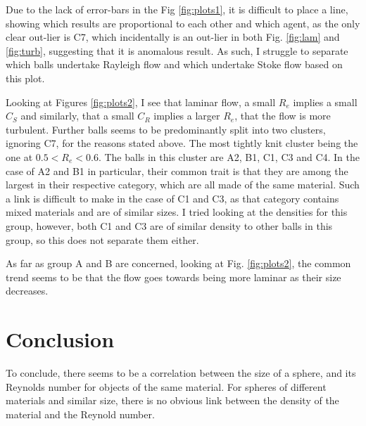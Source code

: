 \documentclass[11pt,a4paper]{article}
\begin{document}
    Due to the lack of error-bars in the Fig \ref{fig:plots1}, it is difficult to place a line, showing which results are proportional to each other and which agent, as the only clear out-lier is C7, which incidentally is an out-lier in both Fig. \ref{fig:lam} and \ref{fig:turb}, suggesting that it is anomalous result. As such, I struggle to separate which balls undertake Rayleigh flow and which undertake Stoke flow based on this plot.

    Looking at Figures \ref{fig:plots2}, I see that laminar flow, a small $R_e$ implies a small $C_S$ and similarly, that a small $C_R$ implies a larger $R_e$, that the flow is more turbulent.
    Further balls seems to be predominantly split into two clusters, ignoring C7, for the reasons stated above. The most tightly knit cluster being the one at $0.5 < R_e < 0.6$. The balls in this cluster are A2, B1, C1, C3 and C4. In the case of A2 and B1 in particular, their common trait is that they are among the largest in their respective category, which are all made of the same material. Such a link is difficult to make in the case of C1 and C3, as that category contains mixed materials and are of similar sizes. I tried looking at the densities for this group, however, both C1 and C3 are of similar density to other balls in this group, so this does not separate them either.

    As far as group A and B are concerned, looking at Fig. \ref{fig:plots2}, the common trend seems to be that the flow goes towards being more laminar as their size decreases.

\section{\label{sect:conclusion}Conclusion}
  To conclude, there seems to be a correlation between the size of a sphere, and its Reynolds number for objects of the same material. For spheres of different materials and similar size, there is no obvious link between the density of the material and the Reynold number.






%
%
\end{document}
